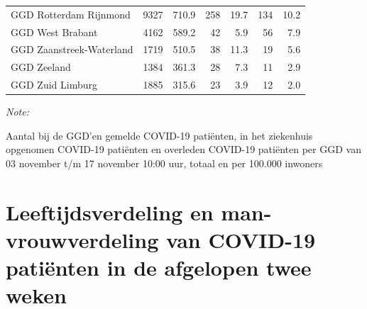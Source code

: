 \documentclass[
  english,
  man,floatsintext]{apa6}
\begin{document}
\begin{table}[H]
\begin{threeparttable}
\begin{tabular}{lrrrrrr}
GGD Rotterdam Rijnmond & 9327 & 710.9 & 258 & 19.7 & 134 & 10.2\\
GGD West Brabant & 4162 & 589.2 & 42 & 5.9 & 56 & 7.9\\
GGD Zaanstreek-Waterland & 1719 & 510.5 & 38 & 11.3 & 19 & 5.6\\
GGD Zeeland & 1384 & 361.3 & 28 & 7.3 & 11 & 2.9\\
GGD Zuid Limburg & 1885 & 315.6 & 23 & 3.9 & 12 & 2.0\\
\bottomrule
\end{tabular}
\begin{tablenotes}
\item \textit{Note: } 
\item Aantal bij de GGD’en gemelde COVID-19 patiënten, in het ziekenhuis opgenomen COVID-19 patiënten en overleden COVID-19 patiënten per GGD van 03 november t/m 17 november 10:00 uur, totaal en per 100.000 inwoners
\end{tablenotes}
\end{threeparttable}
\endgroup{}
\end{table}

\newpage

\hypertarget{leeftijdsverdeling-en-man-vrouwverdeling-van-covid-19-patiuxebnten-in-de-afgelopen-twee-weken}{%
\section{Leeftijdsverdeling en man-vrouwverdeling van COVID-19 patiënten in de afgelopen twee weken}\label{leeftijdsverdeling-en-man-vrouwverdeling-van-covid-19-patiuxebnten-in-de-afgelopen-twee-weken}}
\end{document}
